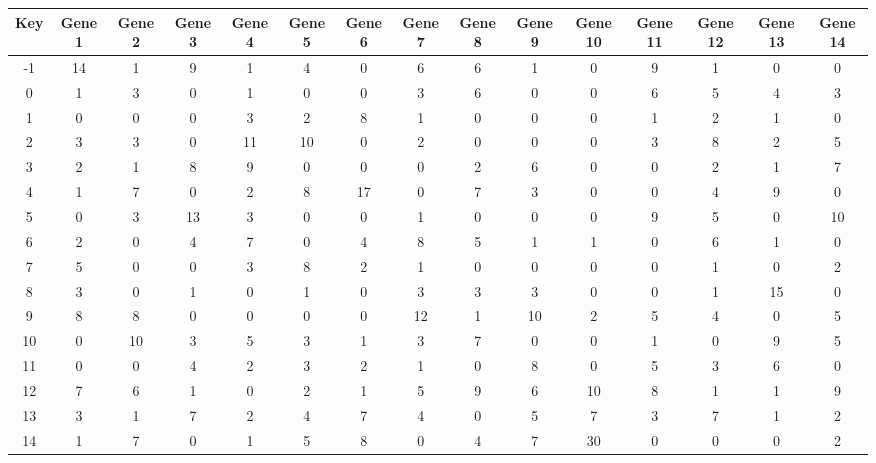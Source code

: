 \begin{tabular}{|c|c|c|c|c|c|c|c|c|c|c|c|c|c|c|}
\hline
Key & Gene 1 & Gene 2 & Gene 3 & Gene 4 & Gene 5 & Gene 6 & Gene 7 & Gene 8 & Gene 9 & Gene 10 & Gene 11 & Gene 12 & Gene 13 & Gene 14 \\
\hline
-1 & 14 & 1 & 9 & 1 & 4 & 0 & 6 & 6 & 1 & 0 & 9 & 1 & 0 & 0 \\
0 & 1 & 3 & 0 & 1 & 0 & 0 & 3 & 6 & 0 & 0 & 6 & 5 & 4 & 3 \\
1 & 0 & 0 & 0 & 3 & 2 & 8 & 1 & 0 & 0 & 0 & 1 & 2 & 1 & 0 \\
2 & 3 & 3 & 0 & 11 & 10 & 0 & 2 & 0 & 0 & 0 & 3 & 8 & 2 & 5 \\
3 & 2 & 1 & 8 & 9 & 0 & 0 & 0 & 2 & 6 & 0 & 0 & 2 & 1 & 7 \\
4 & 1 & 7 & 0 & 2 & 8 & 17 & 0 & 7 & 3 & 0 & 0 & 4 & 9 & 0 \\
5 & 0 & 3 & 13 & 3 & 0 & 0 & 1 & 0 & 0 & 0 & 9 & 5 & 0 & 10 \\
6 & 2 & 0 & 4 & 7 & 0 & 4 & 8 & 5 & 1 & 1 & 0 & 6 & 1 & 0 \\
7 & 5 & 0 & 0 & 3 & 8 & 2 & 1 & 0 & 0 & 0 & 0 & 1 & 0 & 2 \\
8 & 3 & 0 & 1 & 0 & 1 & 0 & 3 & 3 & 3 & 0 & 0 & 1 & 15 & 0 \\
9 & 8 & 8 & 0 & 0 & 0 & 0 & 12 & 1 & 10 & 2 & 5 & 4 & 0 & 5 \\
10 & 0 & 10 & 3 & 5 & 3 & 1 & 3 & 7 & 0 & 0 & 1 & 0 & 9 & 5 \\
11 & 0 & 0 & 4 & 2 & 3 & 2 & 1 & 0 & 8 & 0 & 5 & 3 & 6 & 0 \\
12 & 7 & 6 & 1 & 0 & 2 & 1 & 5 & 9 & 6 & 10 & 8 & 1 & 1 & 9 \\
13 & 3 & 1 & 7 & 2 & 4 & 7 & 4 & 0 & 5 & 7 & 3 & 7 & 1 & 2 \\
14 & 1 & 7 & 0 & 1 & 5 & 8 & 0 & 4 & 7 & 30 & 0 & 0 & 0 & 2 \\
\hline
\end{tabular}
